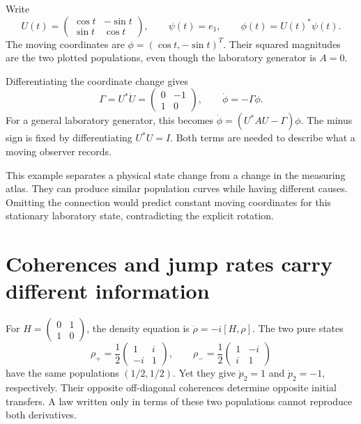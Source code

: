 Write
\[
U(t)=\begin{pmatrix}\cos t&-\sin t\\\sin t&\cos t\end{pmatrix},
\qquad \psi(t)=e_1,\qquad \phi(t)=U(t)^*\psi(t).
\]
The moving coordinates are $\phi=(\cos t,-\sin t)^T$. Their squared magnitudes are the two plotted populations, even though the laboratory generator is $A=0$.

Differentiating the coordinate change gives
\[
\Gamma=U^*\dot U=\begin{pmatrix}0&-1\\1&0\end{pmatrix},
\qquad \dot\phi=-\Gamma\phi.
\]
For a general laboratory generator, this becomes $\dot\phi=(U^*AU-\Gamma)\phi$. The minus sign is fixed by differentiating $U^*U=I$. Both terms are needed to describe what a moving observer records.

This example separates a physical state change from a change in the measuring atlas. They can produce similar population curves while having different causes. Omitting the connection would predict constant moving coordinates for this stationary laboratory state, contradicting the explicit rotation.



\clearpage
\section{Coherences and jump rates carry different information}

For $H=\left(\begin{smallmatrix}0&1\\1&0\end{smallmatrix}\right)$, the density equation is $\dot\rho=-i[H,\rho]$. The two pure states
\[
\rho_+=\frac12\begin{pmatrix}1&i\\-i&1\end{pmatrix},\qquad
\rho_-=\frac12\begin{pmatrix}1&-i\\i&1\end{pmatrix}
\]
have the same populations $(1/2,1/2)$. Yet they give $\dot p_2=1$ and $\dot p_2=-1$, respectively. Their opposite off-diagonal coherences determine opposite initial transfers. A law written only in terms of these two populations cannot reproduce both derivatives.

